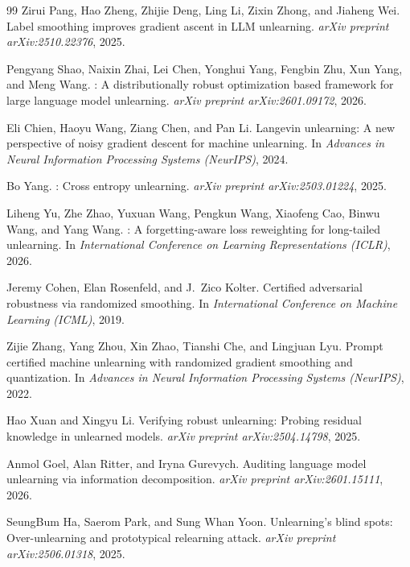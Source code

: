 \documentclass{article}
\begin{document}
\begin{thebibliography}{99}
Zirui Pang, Hao Zheng, Zhijie Deng, Ling Li, Zixin Zhong, and Jiaheng Wei.
\newblock Label smoothing improves gradient ascent in {LLM} unlearning.
\newblock \emph{arXiv preprint arXiv:2510.22376}, 2025.

Pengyang Shao, Naixin Zhai, Lei Chen, Yonghui Yang, Fengbin Zhu, Xun Yang, and Meng Wang.
: A distributionally robust optimization based framework for large language model unlearning.
\newblock \emph{arXiv preprint arXiv:2601.09172}, 2026.

Eli Chien, Haoyu Wang, Ziang Chen, and Pan Li.
\newblock Langevin unlearning: A new perspective of noisy gradient descent for machine unlearning.
\newblock In \emph{Advances in Neural Information Processing Systems (NeurIPS)}, 2024.

Bo Yang.
: Cross entropy unlearning.
\newblock \emph{arXiv preprint arXiv:2503.01224}, 2025.

Liheng Yu, Zhe Zhao, Yuxuan Wang, Pengkun Wang, Xiaofeng Cao, Binwu Wang, and Yang Wang.
: A forgetting-aware loss reweighting for long-tailed unlearning.
\newblock In \emph{International Conference on Learning Representations (ICLR)}, 2026.

Jeremy Cohen, Elan Rosenfeld, and J.~Zico Kolter.
\newblock Certified adversarial robustness via randomized smoothing.
\newblock In \emph{International Conference on Machine Learning (ICML)}, 2019.

Zijie Zhang, Yang Zhou, Xin Zhao, Tianshi Che, and Lingjuan Lyu.
\newblock Prompt certified machine unlearning with randomized gradient smoothing and quantization.
\newblock In \emph{Advances in Neural Information Processing Systems (NeurIPS)}, 2022.

Hao Xuan and Xingyu Li.
\newblock Verifying robust unlearning: Probing residual knowledge in unlearned models.
\newblock \emph{arXiv preprint arXiv:2504.14798}, 2025.

Anmol Goel, Alan Ritter, and Iryna Gurevych.
\newblock Auditing language model unlearning via information decomposition.
\newblock \emph{arXiv preprint arXiv:2601.15111}, 2026.

SeungBum Ha, Saerom Park, and Sung Whan Yoon.
\newblock Unlearning's blind spots: Over-unlearning and prototypical relearning attack.
\newblock \emph{arXiv preprint arXiv:2506.01318}, 2025.


\end{thebibliography}
\end{document}

